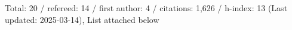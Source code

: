 Total: 20 / refereed: 14 / first author: 4 / citations: 1,626 / h-index: 13 (Last updated: 2025-03-14), List attached below